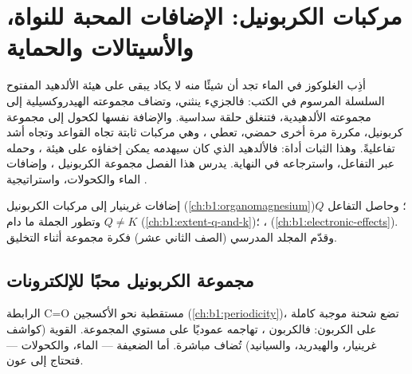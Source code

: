 \chapter{مركبات الكربونيل: الإضافات المحبة للنواة، والأسيتالات والحماية}\label{ch:b1:acetals-protection}

أذِب الغلوكوز في الماء تجد أن شيئًا منه لا يكاد يبقى على هيئة
الألدهيد المفتوح السلسلة المرسوم في الكتب: فالجزيء ينثني، وتضاف مجموعته
الهيدروكسيلية إلى مجموعته الألدهيدية، فتنغلق حلقة سداسية. والإضافة
نفسها لكحول إلى مجموعة كربونيل، مكررة مرة أخرى 
حمضي، تعطي ، وهي مركبات ثابتة تجاه القواعد وتجاه أشد
 تفاعليةً. وهذا الثبات أداة: فالألدهيد الذي كان
سيهدمه  يمكن إخفاؤه على هيئة ، وحمله
عبر التفاعل، واسترجاعه في النهاية. يدرس هذا الفصل
مجموعة الكربونيل ، وإضافات الماء والكحولات،
واستراتيجية .

\begin{recall}
إضافات غرينيار إلى مركبات الكربونيل (\cref{ch:b1:organomagnesium})؛
وحاصل التفاعل $Q$ وتطور الجملة ما دام $Q \neq K$
(\cref{ch:b1:extent-q-and-k})؛ ، 
 (\cref{ch:b1:electronic-effects}). وقدّم المجلد المدرسي (الصف
الثاني عشر) فكرة  مجموعة أثناء التخليق.
\end{recall}

\section{مجموعة الكربونيل محبًا للإلكترونات}

الرابطة C=O مستقطبة نحو الأكسجين (\cref{ch:b1:periodicity})،
  تضع شحنة موجبة كاملة على الكربون:
فالكربون ، تهاجمه  عموديًا على
مستوي المجموعة.  القوية (كواشف غرينيار، والهيدريد،
والسيانيد) تُضاف مباشرة. أما  الضعيفة --- الماء، والكحولات --- فتحتاج إلى عون.

